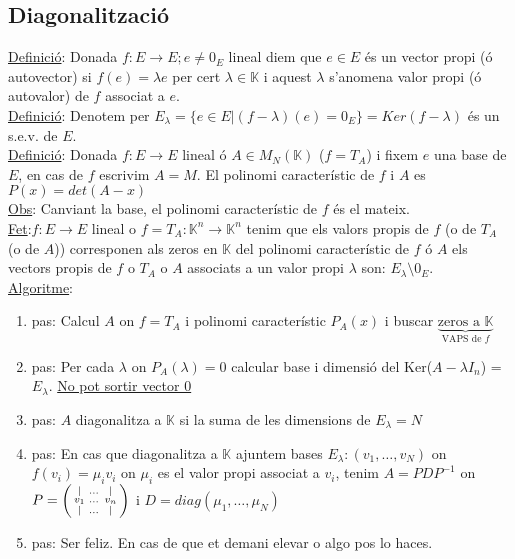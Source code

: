 \subsection{Diagonalització}
\underline{Definició}: Donada $f: E \rightarrow E; e \neq 0_E$ lineal diem que $e \in E$ és un vector propi (ó autovector) si $f(e) = \lambda e$ per cert $\lambda \in \mathbb{K}$ i aquest $\lambda$ s'anomena valor propi (ó autovalor) de $f$ associat a $e$. \\
\underline{Definició}: Denotem per $E_\lambda = \{e\in E | (f-\lambda)(e) = 0_E\} = Ker(f-\lambda)$ és un s.e.v. de $E$.\\
\underline{Definició}: Donada $f: E \rightarrow E$ lineal ó $A \in M_N(\mathbb{K})$ ($f=T_A$) i fixem $e$ una base de $E$, en cas de $f$ escrivim $A=M$. El polinomi característic de $f$ i $A$ es $P(x) = det(A-x)$\\
\underline{Obs}: Canviant la base, el polinomi característic de $f$ és el mateix.\\
\underline{Fet}:$f: E \rightarrow E$ lineal o $f = T_A: \mathbb{K}^n \rightarrow \mathbb{K}^n$ tenim que els valors propis de $f$ (o de $T_A$ (o de $A$)) corresponen als zeros en $\mathbb{K}$ del polinomi característic de $f$ ó $A$ els vectors propis de $f$ o $T_A$ o $A$ associats a un valor propi $\lambda$ son: $E_\lambda \setminus 0_E$.\\
\underline{Algoritme}: 
\begin{enumerate}
    \item pas: Calcul $A$ on $f = T_A$ i polinomi característic $P_A(x)$ i buscar $\underbrace{\text{zeros a }\mathbb{K}}_{\text{VAPS de }f}$
    \item pas: Per cada $\lambda$ on $P_A(\lambda) = 0$ calcular base i dimensió del Ker($A - \lambda I_n$) = $E_\lambda$. \underline{No pot sortir vector 0}
    \item pas: $A$ diagonalitza a $\mathbb{K}$ si la suma de les dimensions de $E_\lambda = N$
    \item pas: En cas que diagonalitza a $\mathbb{K}$ ajuntem bases $E_\lambda: (v_1, \dots, v_N)$ on $f(v_i) = \mu_i v_i$ on $\mu_i$ es el valor propi associat a $v_i$, tenim $A=PDP^{-1}$ on $P = \begin{psmallmatrix} | & \dots & |\\ v_1 & \dots & v_n\\ | & \dots & | \end{psmallmatrix}$ i $D = diag(\mu_1, \dots, \mu_N)$
    \item pas: Ser feliz. En cas de que et demani elevar o algo pos lo haces. 
\end{enumerate}
